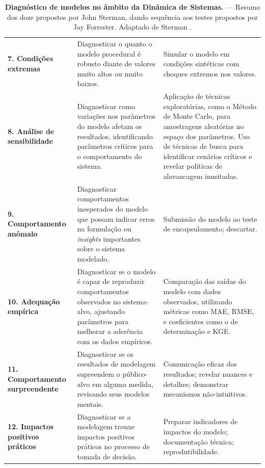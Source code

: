 \documentclass[./main.tex]{subfiles}
\begin{document}
{\begin{table}[t!]
\begin{tabular}{ 
 >{\raggedright\arraybackslash}m{2.75cm}  
 >{\raggedright\arraybackslash}m{5cm}  
 >{\raggedright\arraybackslash}m{5cm}}
        \textbf{7. Condições extremas} & Diagnosticar o quanto o modelo procedural é robusto diante de valores muito altos ou muito baixos.& Simular o modelo em condições sintéticas com choques extremos nos valores.\\

        \textbf{8. Análise de sensibilidade} & Diagnosticar como variações nos parâmetros do modelo afetam os resultados, identificando parâmetros críticos para o comportamento do sistema. & Aplicação de técnicas exploratórias, como o Método de Monte Carlo, para amostragens aleatórias no espaço dos parâmetros. Uso de técnicas de busca para identificar cenários críticos e revelar políticas de alavancagem inusitadas.\\
        
        \textbf{9. Comportamento anômalo} & Diagnosticar comportamentos inesperados do modelo que possam indicar erros na formulação ou \textit{insights} importantes sobre o sistema modelado. & Submissão do modelo ao teste de encapsulamento; descartar.\\
        
        \textbf{10. Adequação empírica} & Diagnosticar se o modelo é capaz de reproduzir comportamentos observados no sistema-alvo, ajustando parâmetros para melhorar a aderência com os dados empíricos. & Comparação das saídas do modelo com dados observados, utilizando métricas como MAE, RMSE, e coeficientes como o de determinação e KGE.\\
        
        \textbf{11. Comportamento surpreendente} & Diagnosticar se os resultados de modelagem supreendem o público-alvo em alguma medida,  revisando seus modelos mentais.& 
        Comunicação eficaz dos resultados; revelar nuances e detalhes; demonstrar mecanismos não-intuitivos.\\  
        
        \textbf{12. Impactos positivos práticos} & Diagnosticar se a modelagem trouxe impactos positivos práticos no processo de tomada de decisão.& Preparar indicadores de impactos do modelo; documentação técnica; reprodutibilidade.\\  
        \bottomrule
    \end{tabular}
    \caption[Diagnóstico de modelos.]{
    \textbf{Diagnóstico de modelos no âmbito da Dinâmica de Sistemas.}\; --- \;Resumo dos doze   propostos por John Sterman, dando sequência aos testes propostos por Jay Forrester. Adaptado de Sterman \cite{sterman2000}.
    }
    \label{tbl:tests}
\end{table}
}
\end{document}
